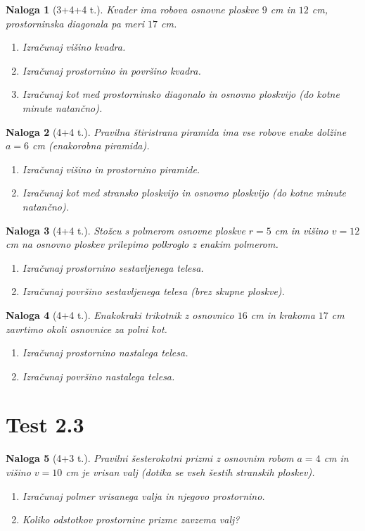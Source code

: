 \documentclass[a4paper,12pt]{article}
\theoremstyle{naloga}
\newtheorem{naloga}{Naloga}[section]
\begin{document}
\begin{naloga}[3+4+4 t.]
Kvader ima robova osnovne ploskve $9$ cm in $12$ cm, prostorninska diagonala pa meri $17$ cm.
\begin{enumerate}
\item Izračunaj višino kvadra.
\item Izračunaj prostornino in površino kvadra.
\item Izračunaj kot med prostorninsko diagonalo in osnovno ploskvijo (do kotne minute natančno).
\end{enumerate}
\end{naloga}

\begin{naloga}[4+4 t.]
Pravilna štiristrana piramida ima vse robove enake dolžine $a=6$ cm (enakorobna piramida).
\begin{enumerate}
\item Izračunaj višino in prostornino piramide.
\item Izračunaj kot med stransko ploskvijo in osnovno ploskvijo (do kotne minute natančno).
\end{enumerate}
\end{naloga}

\begin{naloga}[4+4 t.]
Stožcu s polmerom osnovne ploskve $r=5$ cm in višino $v=12$ cm na osnovno ploskev prilepimo polkroglo z enakim polmerom.
\begin{enumerate}
\item Izračunaj prostornino sestavljenega telesa.
\item Izračunaj površino sestavljenega telesa (brez skupne ploskve).
\end{enumerate}
\end{naloga}

\begin{naloga}[4+4 t.]
Enakokraki trikotnik z osnovnico $16$ cm in krakoma $17$ cm zavrtimo okoli osnovnice za polni kot.
\begin{enumerate}
\item Izračunaj prostornino nastalega telesa.
\item Izračunaj površino nastalega telesa.
\end{enumerate}
\end{naloga}

\section{Test 2.3}

\begin{naloga}[4+3 t.]
Pravilni šesterokotni prizmi z osnovnim robom $a=4$ cm in višino $v=10$ cm je vrisan valj (dotika se vseh šestih stranskih ploskev).
\begin{enumerate}
\item Izračunaj polmer vrisanega valja in njegovo prostornino.
\item Koliko odstotkov prostornine prizme zavzema valj?
\end{enumerate}
\end{naloga}
\end{document}

